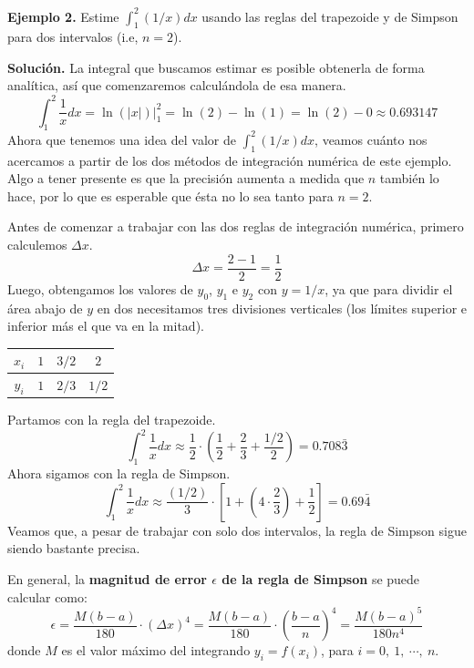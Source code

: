\documentclass[12pt]{article}
\begin{document}
\textbf{Ejemplo 2.} Estime $\int_{1}^{2} (1/x)dx$ usando las reglas del trapezoide y de Simpson para dos intervalos (i.e, $n = 2$).

\textbf{Solución.} La integral que buscamos estimar es posible obtenerla de forma analítica, así que comenzaremos calculándola de esa manera.
\[
  \int_{1}^{2} \frac{1}{x} dx = \ln(|x|) |_{1}^{2} = \ln(2) - \ln(1) = \ln(2) - 0 \approx 0.693147
\]
Ahora que tenemos una idea del valor de $\int_{1}^{2} (1/x)dx$, veamos cuánto nos acercamos a partir de los dos métodos de integración numérica de este ejemplo. Algo a tener presente es que la precisión aumenta a medida que $n$ también lo hace, por lo que es esperable que ésta no lo sea tanto para $n = 2$.

Antes de comenzar a trabajar con las dos reglas de integración numérica, primero calculemos $\Delta x$.
\[
  \Delta x = \frac{2 - 1}{2} = \frac{1}{2}
\]
Luego, obtengamos los valores de $y_{0}$, $y_{1}$ e $y_{2}$ con $y = 1/x$, ya que para dividir el área abajo de $y$ en dos necesitamos tres divisiones verticales (los límites superior e inferior más el que va en la mitad).

\begin{table}[hbt!]
\centering

\begin{tabular}{c|c c c}
$x_{i}$ & $1$ & $3/2$ & $2$ \\
\hline
$y_{i}$ & $1$ & $2/3$ & $1/2$
\end{tabular}

\end{table}

Partamos con la regla del trapezoide.
\[
  \int_{1}^{2} \frac{1}{x}dx \approx \frac{1}{2} \cdot \left(\frac{1}{2} + \frac{2}{3} + \frac{1/2}{2}\right) = 0.708\bar{3}
\]
Ahora sigamos con la regla de Simpson.
\[
  \int_{1}^{2} \frac{1}{x}dx \approx \frac{(1/2)}{3} \cdot \left[1 + \left(4 \cdot \frac{2}{3}\right) + \frac{1}{2}\right] = 0.69\bar{4}
\]
Veamos que, a pesar de trabajar con solo dos intervalos, la regla de Simpson sigue siendo bastante precisa.

En general, la \textbf{magnitud de error $\epsilon$ de la regla de Simpson} se puede calcular como:
\[
  \epsilon = \frac{M(b - a)}{180} \cdot (\Delta x)^{4}
           = \frac{M(b - a)}{180} \cdot \left(\frac{b - a}{n}\right)^{4}
           = \frac{M(b - a)^{5}}{180n^{4}}
\]
donde $M$ es el valor máximo del integrando $y_{i} = f(x_{i})$, para $i = 0, \ 1, \ \cdots, \ n$.
\end{document}
